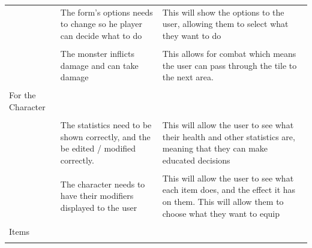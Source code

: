 \documentclass[12pt]{article}
\begin{document}
\begin{tabularx}{\linewidth}{XXX}
                        & The form’s options needs to change so he player can decide what to do                              & This will show the options to the user, allowing them to select what they want to do                                                                                                                                                               \\\\
                        & The monster inflicts damage and can take damage                                                    & This allows for combat which means the user can pass through the tile to the next area.                                                                                                                                                            \\\\
For the Character       &                                                                                                    &                                                                                                                                                                                                                                                    \\\\
                        & The statistics need to be shown correctly, and the be edited / modified correctly.                 & This will allow the user to see what their health and other statistics are, meaning that they can make educated decisions                                                                                                                          \\\\
                        & The character needs to have their modifiers displayed to the user                                  & This will allow the user to see what each item does, and the effect it has on them. This will allow them to choose what they want to equip                                                                                                        \\\\
Items                   &                                                                                                    &                                                                                                                                                                                                                                                    \\\\

\end{tabularx}
\end{document}
